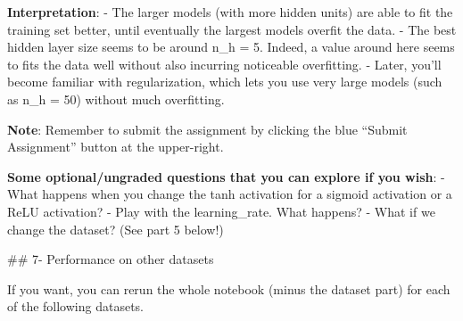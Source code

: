 \documentclass[11pt]{article}
\begin{document}
    \textbf{Interpretation}: - The larger models (with more hidden units)
are able to fit the training set better, until eventually the largest
models overfit the data. - The best hidden layer size seems to be around
n\_h = 5. Indeed, a value around here seems to fits the data well
without also incurring noticeable overfitting. - Later, you'll become
familiar with regularization, which lets you use very large models (such
as n\_h = 50) without much overfitting.

    \textbf{Note}: Remember to submit the assignment by clicking the blue
``Submit Assignment'' button at the upper-right.

\textbf{Some optional/ungraded questions that you can explore if you
wish}: - What happens when you change the tanh activation for a sigmoid
activation or a ReLU activation? - Play with the learning\_rate. What
happens? - What if we change the dataset? (See part 5 below!)

    \#\# 7- Performance on other datasets

    If you want, you can rerun the whole notebook (minus the dataset part)
for each of the following datasets.
\end{document}
